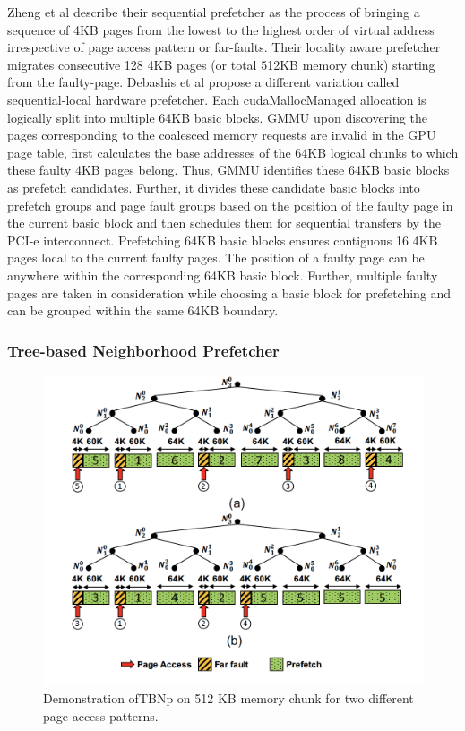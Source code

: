 Zheng et al describe their sequential prefetcher as the process of bringing a sequence of 4KB pages from the lowest to the highest order of virtual address irrespective of page access pattern or far-faults. Their locality aware prefetcher migrates consecutive 128 4KB pages (or total 512KB memory chunk) starting from the faulty-page. Debashis et al propose a different variation called sequential-local hardware prefetcher. Each cudaMallocManaged allocation is logically split into multiple 64KB basic blocks. GMMU upon discovering the pages corresponding to the coalesced memory requests are invalid in the GPU page table, first calculates the base addresses of the 64KB logical chunks to which these faulty 4KB pages belong. Thus, GMMU identifies these 64KB basic blocks as prefetch candidates. Further, it divides these candidate basic blocks into prefetch groups and page fault groups based on the position of the faulty page in the current basic block and then schedules them for sequential transfers by the PCI-e interconnect. Prefetching 64KB basic blocks ensures contiguous 16 4KB pages local to the current faulty pages. The position of a faulty page can be anywhere within the corresponding 64KB basic block. Further, multiple faulty pages are taken in consideration while choosing a basic block for prefetching and can be grouped within the same 64KB boundary.

\subsubsection{Tree-based Neighborhood Prefetcher}

    \begin{figure}[!htb]
      \centering
      \setlength{\abovecaptionskip}{6pt plus 1pt minus 1pt}
      \includegraphics[width=.90\textwidth,keepaspectratio]{figures1/prefetchers.elf}
      \captionsetup{width=.90\textwidth}
      \caption{Demonstration ofTBNp on 512 KB memory chunk for two different page access patterns.}
      \label{fig:prefetchers}
    \end{figure}

